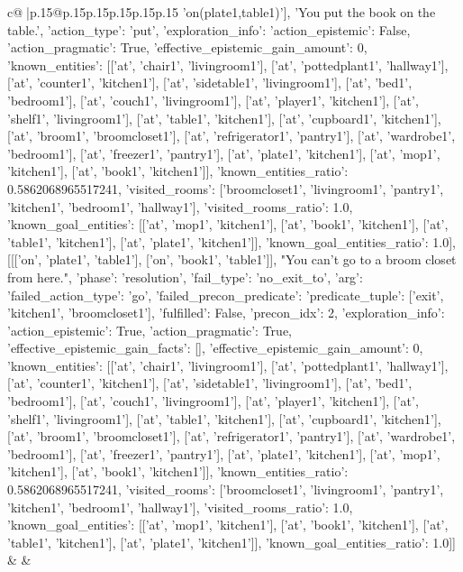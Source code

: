 \documentclass{article}
\begin{document}
{\begin{supertabular}{c@{$\;$}|p{.15\linewidth}@{}p{.15\linewidth}p{.15\linewidth}p{.15\linewidth}p{.15\linewidth}p{.15\linewidth}}
{{{'on(plate1,table1)'], 'You put the book on the table.', {'action_type': 'put', 'exploration_info': {'action_epistemic': False, 'action_pragmatic': True, 'effective_epistemic_gain_amount': 0, 'known_entities': [['at', 'chair1', 'livingroom1'], ['at', 'pottedplant1', 'hallway1'], ['at', 'counter1', 'kitchen1'], ['at', 'sidetable1', 'livingroom1'], ['at', 'bed1', 'bedroom1'], ['at', 'couch1', 'livingroom1'], ['at', 'player1', 'kitchen1'], ['at', 'shelf1', 'livingroom1'], ['at', 'table1', 'kitchen1'], ['at', 'cupboard1', 'kitchen1'], ['at', 'broom1', 'broomcloset1'], ['at', 'refrigerator1', 'pantry1'], ['at', 'wardrobe1', 'bedroom1'], ['at', 'freezer1', 'pantry1'], ['at', 'plate1', 'kitchen1'], ['at', 'mop1', 'kitchen1'], ['at', 'book1', 'kitchen1']], 'known_entities_ratio': 0.5862068965517241, 'visited_rooms': ['broomcloset1', 'livingroom1', 'pantry1', 'kitchen1', 'bedroom1', 'hallway1'], 'visited_rooms_ratio': 1.0, 'known_goal_entities': [['at', 'mop1', 'kitchen1'], ['at', 'book1', 'kitchen1'], ['at', 'table1', 'kitchen1'], ['at', 'plate1', 'kitchen1']], 'known_goal_entities_ratio': 1.0}}], [[['on', 'plate1', 'table1'], ['on', 'book1', 'table1']], "You can't go to a broom closet from here.", {'phase': 'resolution', 'fail_type': 'no_exit_to', 'arg': {'failed_action_type': 'go', 'failed_precon_predicate': {'predicate_tuple': ['exit', 'kitchen1', 'broomcloset1'], 'fulfilled': False, 'precon_idx': 2}}, 'exploration_info': {'action_epistemic': True, 'action_pragmatic': True, 'effective_epistemic_gain_facts': [], 'effective_epistemic_gain_amount': 0, 'known_entities': [['at', 'chair1', 'livingroom1'], ['at', 'pottedplant1', 'hallway1'], ['at', 'counter1', 'kitchen1'], ['at', 'sidetable1', 'livingroom1'], ['at', 'bed1', 'bedroom1'], ['at', 'couch1', 'livingroom1'], ['at', 'player1', 'kitchen1'], ['at', 'shelf1', 'livingroom1'], ['at', 'table1', 'kitchen1'], ['at', 'cupboard1', 'kitchen1'], ['at', 'broom1', 'broomcloset1'], ['at', 'refrigerator1', 'pantry1'], ['at', 'wardrobe1', 'bedroom1'], ['at', 'freezer1', 'pantry1'], ['at', 'plate1', 'kitchen1'], ['at', 'mop1', 'kitchen1'], ['at', 'book1', 'kitchen1']], 'known_entities_ratio': 0.5862068965517241, 'visited_rooms': ['broomcloset1', 'livingroom1', 'pantry1', 'kitchen1', 'bedroom1', 'hallway1'], 'visited_rooms_ratio': 1.0, 'known_goal_entities': [['at', 'mop1', 'kitchen1'], ['at', 'book1', 'kitchen1'], ['at', 'table1', 'kitchen1'], ['at', 'plate1', 'kitchen1']], 'known_goal_entities_ratio': 1.0}}]] 
	  } 
	   } 
	   } 
	 & & \\ 
 

    \theutterance {}  


\end{supertabular}}
\end{document}
